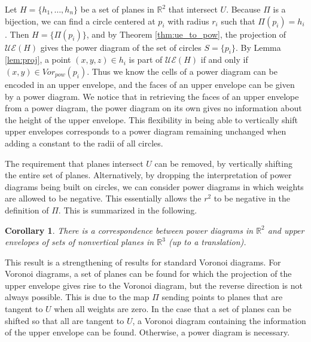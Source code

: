 \documentclass[a4paper, 11pt]{article}
\newtheorem{corollary}{Corollary}[section]
\newcommand{\R}{\mathbb{R}}
\begin{document}
Let $H = \{ h_1,\dots, h_n \}$ be a set of planes in $\R^2$ that intersect $U$. Because $\Pi$ is a bijection, we can find a circle centered at $p_i$
with radius $r_i$ such that $\Pi( p_i ) = h_i$. Then $H = \{ \Pi(p_i) \}$, and by Theorem \ref{thm:ue_to_pow}, the projection of $\mathcal{UE}(H)$ gives the
power diagram of the set of circles $S = \{ p_i \}$. By Lemma \ref{lem:proj}, a point $(x,y,z) \in h_i$ is part of $\mathcal{UE}(H)$ if and only if $(x,y) \in
Vor_{pow}(p_i)$. Thus we know the cells of a power diagram can be encoded in an upper envelope, and the
faces of an upper envelope can be given by a power diagram. We notice that in retrieving the faces of an upper envelope from a power diagram, the
power diagram on its own gives no information about the height of the upper envelope. This flexibility in being able to vertically shift upper
envelopes corresponds to a power diagram remaining unchanged when adding a constant to the radii of all circles.

The requirement that planes intersect $U$ can be removed, by vertically shifting the entire set of planes. Alternatively, by dropping the
interpretation of power diagrams being built on circles, we can consider power diagrams in which weights are allowed to be negative. This essentially
allows the $r^2$ to be negative in the definition of $\Pi$. This is summarized in the following.

\begin{corollary}
  There is a correspondence between power diagrams in $\R^2$ and upper envelopes of sets of nonvertical planes in $\R^3$ (up to a translation).
  \label{cor:ue_pow}
\end{corollary}

This result is a strengthening of results for standard Voronoi diagrams. For Voronoi diagrams, a set of planes can be found for which the projection
of the upper envelope gives rise to the Voronoi diagram, but the reverse direction is not always possible. This is due to the map $\Pi$ sending points
to planes that are tangent to $U$ when all weights are zero. In the case that a set of planes can be shifted so that all are tangent to $U$, a Voronoi diagram containing the
information of the upper envelope can be found. Otherwise, a power diagram is necessary.
\end{document}
